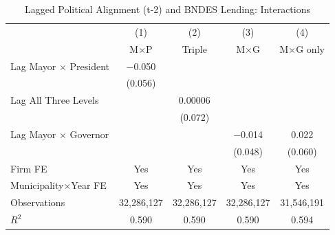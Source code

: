 \documentclass{article}
\begin{document}
\begin{table}[H]
    \centering
    \caption{Lagged Political Alignment (t-2) and BNDES Lending: Interactions}
    \label{tab:lagged_interactions}
    \begin{threeparttable}
        \begin{tabular}{lcccc}
            \toprule
                                         & (1)        & (2)        & (3)        & (4)             \\
                                         & M$\times$P & Triple     & M$\times$G & M$\times$G only \\
            \midrule
            Lag Mayor $\times$ President & $-$0.050   &            &            &                 \\
                                         & (0.056)    &            &            &                 \\
            Lag All Three Levels         &            & 0.00006    &            &                 \\
                                         &            & (0.072)    &            &                 \\
            Lag Mayor $\times$ Governor  &            &            & $-$0.014   & 0.022           \\
                                         &            &            & (0.048)    & (0.060)         \\
            \midrule
            Firm FE                      & Yes        & Yes        & Yes        & Yes             \\
            Municipality$\times$Year FE  & Yes        & Yes        & Yes        & Yes             \\
            \midrule
            Observations                 & 32,286,127 & 32,286,127 & 32,286,127 & 31,546,191      \\
            $R^2$                        & 0.590      & 0.590      & 0.590      & 0.594           \\
            \bottomrule
        \end{tabular}
        \begin{tablenotes}
            \small

\end{tablenotes}
\end{threeparttable}
\end{table}
\end{document}
